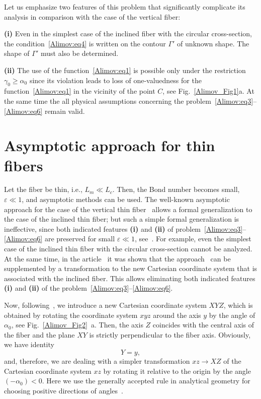 \documentclass[
11pt,%
tightenlines,%
twoside,%
onecolumn,%
nofloats,%
nobibnotes,%
nofootinbib,%
superscriptaddress,%
noshowpacs,%
centertags]%
{revtex4-2}
\begin{document}
Let us emphasize two features of this problem that significantly complicate its analysis in
comparison with the case of the vertical fiber:

\textbf{(i)} Even in the simplest case of the inclined fiber with the circular cross-section, the
condition~\eqref{Alimov:eq4} is written on the contour ${\Gamma}'$ of unknown shape. The shape of
${\Gamma}'$ must also be determined.

\textbf{(ii)} The use of the function~\eqref{Alimov:eq1} is possible only under the restriction
$\gamma_0 \ge \alpha_0$ since its violation leads to loss of one-valuedness for the
function~\eqref{Alimov:eq1} in the vicinity of the point $C$, see Fig.~\ref{Alimov_Fig1}a. At the
same time the all physical assumptions concerning the
problem~\eqref{Alimov:eq3}--\eqref{Alimov:eq6} remain valid.

\section{Asymptotic approach for thin fibers} \label{Alimov:sec2}
Let the fiber be thin, i.e., $L_m \ll L_c$. Then, the Bond number becomes small, $\varepsilon \ll 1$,
and asymptotic methods can be used. The well-known asymptotic approach for the case of the vertical
thin fiber~\cite{Alimov:bib5} allows a formal generalization to the case of the inclined thin
fiber; but such a simple formal generalization is ineffective, since both indicated features
\textbf{(i)} and \textbf{(ii)} of problem~\eqref{Alimov:eq3}--\eqref{Alimov:eq6} are preserved for
small $\varepsilon \ll 1$, see~\cite{Alimov:bib9}. For example, even the simplest case of the
inclined thin fiber with the circular cross-section cannot be analyzed. At the same time, in the
article~\cite{Alimov:bib9} it was shown that the approach~\cite{Alimov:bib5} can be supplemented by
a transformation to the new Cartesian coordinate system that is associated with the inclined fiber.
This allows eliminating both indicated features \textbf{(i)} and \textbf{(ii)} of the
problem~\eqref{Alimov:eq3}--\eqref{Alimov:eq6}.

Now, following~\cite{Alimov:bib9}, we introduce a new Cartesian coordinate system $XYZ$, which is
obtained by rotating the coordinate system $xyz$ around the axis $y$ by the angle of $\alpha_0$,
see Fig.~\ref{Alimov_Fig2}~a. Then, the axis $Z$ coincides with the central axis of the fiber and the
plane $XY$ is strictly perpendicular to the fiber axis. Obviously, we have identity
\begin{equation}
\label{Alimov:eq7} Y = y,
\end{equation}
 and, therefore, we are dealing with a simpler transformation $xz \to XZ$ of the Cartesian
coordinate system $xz$ by rotating it relative to the origin by the angle $( - \alpha_0 ) < 0$.
Here we use the generally accepted rule in analytical geometry for choosing positive directions of
angles~\cite{Alimov:bib13}.
\end{document}
